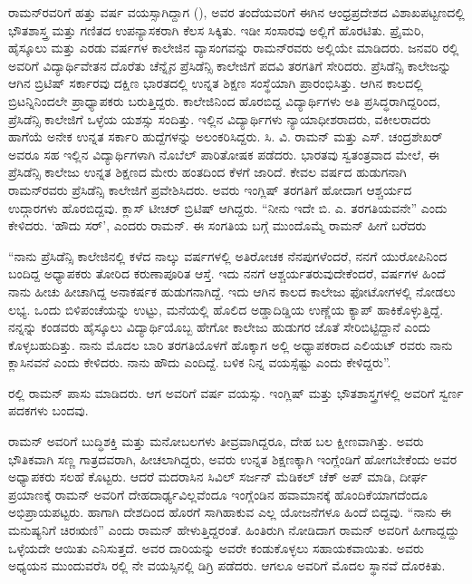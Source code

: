 ರಾಮನ್‍ರವರಿಗೆ ಹತ್ತು ವರ್ಷ ವಯಸ್ಸಾಗಿದ್ದಾಗ (), ಅವರ ತಂದೆಯವರಿಗೆ ಈಗಿನ ಆಂಧ್ರಪ್ರದೇಶದ ವಿಶಾಖಪಟ್ಟಣದಲ್ಲಿ ಭೌತಶಾಸ್ತ್ರ ಮತ್ತು ಗಣಿತದ ಉಪನ್ಯಾಸಕರಾಗಿ ಕೆಲಸ ಸಿಕ್ಕಿತು. ಇಡೀ ಸಂಸಾರವು ಅಲ್ಲಿಗೆ ಹೊರಟಿತು. ಪ್ರೈಮರಿ, ಹೈಸ್ಕೂಲು ಮತ್ತು ಎರಡು ವರ್ಷಗಳ ಕಾಲೇಜಿನ ವ್ಯಾಸಂಗವನ್ನು ರಾಮನ್‍ರವರು ಅಲ್ಲಿಯೇ ಮಾಡಿದರು. ಜನವರಿ ರಲ್ಲಿ ಅವರಿಗೆ ವಿದ್ಯಾರ್ಥಿವೇತನ ದೊರೆತು ಚೆನ್ನೈನ ಪ್ರೆಸಿಡೆನ್ಸಿ ಕಾಲೇಜಿಗೆ ಪದವಿ ತರಗತಿಗೆ ಸೇರಿದರು. ಪ್ರೆಸಿಡೆನ್ಸಿ ಕಾಲೇಜನ್ನು ಆಗಿನ ಬ್ರಿಟಿಷ್ ಸರ್ಕಾರವು ದಕ್ಷಿಣ ಭಾರತದಲ್ಲಿ ಉನ್ನತ ಶಿಕ್ಷಣ ಸಂಸ್ಥೆಯಾಗಿ ಪ್ರಾರಂಭಿಸಿತ್ತು. ಆಗಿನ ಕಾಲದಲ್ಲಿ ಬ್ರಿಟನ್ನಿನಿಂದಲೇ ಪ್ರಾಧ್ಯಾಪಕರು ಬರುತ್ತಿದ್ದರು. ಕಾಲೇಜಿನಿಂದ ಹೊರಬಿದ್ದ ವಿದ್ಯಾರ್ಥಿಗಳು ಅತಿ ಪ್ರಸಿದ್ಧರಾಗಿದ್ದರಿಂದ, ಪ್ರೆಸಿಡೆನ್ಸಿ ಕಾಲೇಜಿಗೆ ಒಳ್ಳೆಯ ಯಶಸ್ಸು ಸಂದಿತ್ತು. ಇಲ್ಲಿನ ವಿದ್ಯಾರ್ಥಿಗಳು ನ್ಯಾಯಾಧೀಶರಾದರು, ವಕೀಲರಾದರು ಹಾಗೆಯೆ ಅನೇಕ ಉನ್ನತ ಸರ್ಕಾರಿ ಹುದ್ದೆಗಳನ್ನು ಅಲಂಕರಿಸಿದ್ದರು. ಸಿ. ವಿ. ರಾಮನ್ ಮತ್ತು ಎಸ್. ಚಂದ್ರಶೇಖರ್ ಅವರೂ ಸಹ ಇಲ್ಲಿನ ವಿದ್ಯಾರ್ಥಿಗಳಾಗಿ ನೊಬೆಲ್ ಪಾರಿತೋಷಕ ಪಡೆದರು. ಭಾರತವು ಸ್ವತಂತ್ರವಾದ ಮೇಲೆ, ಈ ಪ್ರೆಸಿಡೆನ್ಸಿ ಕಾಲೇಜು ಉನ್ನತ ಶಿಕ್ಷಣದ ಮೇರು ಹಂತದಿಂದ ಕೆಳಗೆ ಜಾರಿದೆ. ಕೇವಲ  ವರ್ಷದ ಹುಡುಗನಾಗಿ ರಾಮನ್‍ರವರು ಪ್ರೆಸಿಡೆನ್ಸಿ ಕಾಲೇಜಿಗೆ ಪ್ರವೇಶಿಸಿದರು. ಅವರು ಇಂಗ್ಲಿಷ್ ತರಗತಿಗೆ ಹೋದಾಗ ಆಶ್ಚರ್ಯದ ಉದ್ಗಾರಗಳು ಹೊರಬಿದ್ದವು. ಕ್ಲಾಸ್ ಟೀಚರ್ ಬ್ರಿಟಿಷ್ ಆಗಿದ್ದರು. “ನೀನು ಇದೇ ಬಿ. ಎ. ತರಗತಿಯವನೇ” ಎಂದು ಕೇಳಿದರು. ‘ಹೌದು ಸರ್’, ಎಂದರು ರಾಮನ್. ಈ ಸಂಗತಿಯ ಬಗ್ಗೆ ಮುಂದೊಮ್ಮೆ ರಾಮನ್ ಹೀಗೆ ಬರೆದರು

“ನಾನು ಪ್ರೆಸಿಡೆನ್ಸಿ ಕಾಲೇಜಿನಲ್ಲಿ ಕಳೆದ ನಾಲ್ಕು ವರ್ಷಗಳಲ್ಲಿ ಅತಿರೋಚಕ ನೆನಪುಗಳೆಂದರೆ, ನನಗೆ ಯುರೋಪಿನಿಂದ ಬಂದಿದ್ದ ಅಧ್ಯಾಪಕರು ತೋರಿದ ಕರುಣಾಪೂರಿತ ಆಸ್ತೆ. ಇದು ನನಗೆ ಆಶ್ಚರ್ಯತರುವುದೇಕೆಂದರೆ,  ವರ್ಷಗಳ ಹಿಂದೆ ನಾನು ಹೀಚು  ಹೀಚಾಗಿದ್ದ ಅನಾಕರ್ಷಕ ಹುಡುಗನಾಗಿದ್ದೆ. ಇದು ಆಗಿನ ಕಾಲದ ಕಾಲೇಜು ಫೋಟೋಗಳಲ್ಲಿ ನೋಡಲು ಲಭ್ಯ. ಒಂದು ಬಿಳಿಪಂಚೆಯನ್ನು ಉಟ್ಟು, ಮನೆಯಲ್ಲಿ ಹೊಲಿದ ಅಡ್ಡಾದಿಡ್ಡಿಯ ಉಣ್ಣೆಯ ಕ್ಯಾಪ್ ಹಾಕಿಕೊಳ್ಳುತ್ತಿದ್ದೆ. ನನ್ನನ್ನು ಕಂಡವರು ಹೈಸ್ಕೂಲು ವಿದ್ಯಾರ್ಥಿಯೊಬ್ಬ ಹೇಗೋ ಕಾಲೇಜು ಹುಡುಗರ ಜೊತೆ ಸೇರಿಬಿಟ್ಟಿದ್ದಾನೆ ಎಂದು ಕೊಳ್ಳಬಹುದಿತ್ತು. ನಾನು ಮೊದಲ ಬಾರಿ ತರಗತಿಯೊಳಗೆ ಹೊಕ್ಕಾಗ ಅಲ್ಲಿ ಅಧ್ಯಾಪಕರಾದ  ಎಲಿಯಟ್ ರವರು ನಾನು  ಕ್ಲಾಸಿನವನೆ ಎಂದು ಕೇಳಿದರು. ನಾನು ಹೌದು ಎಂದಿದ್ದೆ. ಬಳಿಕ ನಿನ್ನ ವಯಸ್ಸೆಷ್ಟು ಎಂದು ಕೇಳಿದ್ದರು”.

ರಲ್ಲಿ ರಾಮನ್  ಪಾಸು ಮಾಡಿದರು. ಆಗ ಅವರಿಗೆ  ವರ್ಷ ವಯಸ್ಸು. ಇಂಗ್ಲಿಷ್ ಮತ್ತು ಭೌತಶಾಸ್ತ್ರಗಳಲ್ಲಿ ಅವರಿಗೆ ಸ್ವರ್ಣ ಪದಕಗಳು ಬಂದವು.

ರಾಮನ್ ಅವರಿಗೆ ಬುದ್ಧಿಶಕ್ತಿ ಮತ್ತು ಮನೋಬಲಗಳು ತೀವ್ರವಾಗಿದ್ದರೂ, ದೇಹ ಬಲ ಕ್ಷೀಣವಾಗಿತ್ತು. ಅವರು ಭೌತಿಕವಾಗಿ ಸಣ್ಣ ಗಾತ್ರದವರಾಗಿ, ಹೀಚಲಾಗಿದ್ದರು, ಅವರು ಉನ್ನತ ಶಿಕ್ಷಣಕ್ಕಾಗಿ ಇಂಗ್ಲೆಂಡಿಗೆ ಹೋಗಬೇಕೆಂದು ಅವರ ಅಧ್ಯಾಪಕರು ಸಲಹೆ ಕೊಟ್ಟರು. ಆದರೆ ಮದರಾಸಿನ ಸಿವಿಲ್ ಸರ್ಜನ್ ಮೆಡಿಕಲ್ ಚೆಕ್ ಅಪ್ ಮಾಡಿ, ದೀರ್ಘ ಪ್ರಯಾಣಕ್ಕೆ ರಾಮನ್ ಅವರಿಗೆ ದೇಹದಾರ್ಢ್ಯವಿಲ್ಲವೆಂದೂ ಇಂಗ್ಲೆಂಡಿನ ಹವಾಮಾನಕ್ಕೆ ಹೊಂದಿಕೆಯಾಗದೆಂದೂ ಅಭಿಪ್ರಾಯಪಟ್ಟರು. ಹಾಗಾಗಿ ದೇಶದಿಂದ ಹೊರಗೆ ಸಾಗಿಹಾಕುವ ಎಲ್ಲ ಯೋಜನೆಗಳೂ ಹಿಂದೆ ಬಿದ್ದವು. “ನಾನು ಈ ಮನುಷ್ಯನಿಗೆ ಚಿರಋಣಿ” ಎಂದು ರಾಮನ್ ಹೇಳುತ್ತಿದ್ದರಂತೆ. ಹಿಂತಿರುಗಿ ನೋಡಿದಾಗ ರಾಮನ್ ಅವರಿಗೆ ಹೀಗಾದ್ದದ್ದು ಒಳ್ಳೆಯದೇ ಆಯಿತು ಎನಿಸುತ್ತದೆ. ಅವರ ದಾರಿಯನ್ನು ಅವರೇ ಕಂಡುಕೊಳ್ಳಲು ಸಹಾಯಕವಾಯಿತು. ಅವರು ಅಧ್ಯಯನ ಮುಂದುವರೆಸಿ ರಲ್ಲಿ ನೇ ವಯಸ್ಸಿನಲ್ಲಿ  ಡಿಗ್ರಿ ಪಡೆದರು. ಆಗಲೂ ಅವರಿಗೆ ಮೊದಲ ಸ್ಥಾನವೆ ದೊರಕಿತು.

